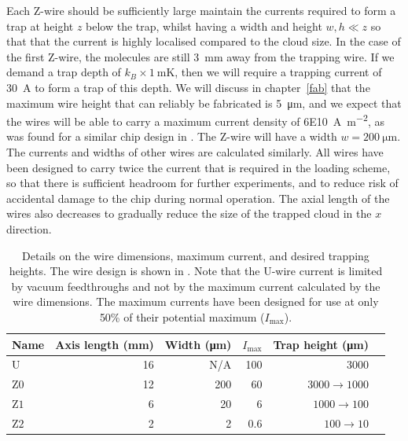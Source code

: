 Each Z-wire should be sufficiently large maintain the currents required to form
a trap at height $z$ below the trap, whilst having a width and height  $w, h
\ll z$ so that that the current is highly localised compared to the cloud size.
%
In the case of the first Z-wire, the molecules are still \SI{3}{\milli\meter}
away from the trapping wire. If we demand a trap depth of
$k_B\times\SI{1}{\milli\kelvin}$, then we will require a trapping current of
\SI{30}{\ampere} to form a trap of this depth.  We will discuss in
chapter~\ref{fab} that the maximum wire height that can reliably be fabricated
is \SI{5}{\micro\meter}, and we expect that the wires will be able to carry a
maximum current density of \SI{6E10}{\ampere\per\meter\squared}, as was found
for a similar chip design in . The Z-wire will
have a width $w=\SI{200}{\micro\meter}$. The currents and widths of other wires
are calculated similarly.
%
All wires have been designed to
carry twice the current that is required in the loading scheme, so that there
is sufficient headroom for further experiments, and to reduce risk of
accidental damage to the chip during normal operation.
%
The axial length of the wires also decreases to gradually reduce the size of
the trapped cloud in the $x$ direction.  

\begin{table}
  \centering
\begin{tabular}{lrrrrr}
  Name & Axis length (\si{\milli\meter}) & Width (\si{\micro\meter})& $I_\text{max}$ & Trap height (\si{\micro\meter}) \\
 \hline
  U & 16 & N/A& 100 & 3000\\
  $\mathrm{Z0}$ & 12 & 200& 60& $3000\rightarrow1000$ \\
  $\mathrm{Z1}$ &  6 & 20& 6& $1000\rightarrow100$ \\
  $\mathrm{Z2}$ &  2 & 2& 0.6& $100\rightarrow10$ \\
 \hline
\end{tabular}
  \caption{Details on the wire dimensions, maximum current, and desired
  trapping heights. The wire design is shown in
  . Note that the U-wire current is
  limited by vacuum feedthroughs and not by the maximum current calculated by
  the wire dimensions.  The maximum currents have been designed for use at only
  50\% of their potential maximum ($I_\text{max}$).
  }
  \label{overview:table:wires}
\end{table}

